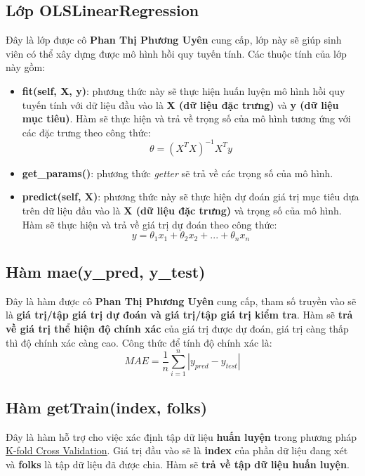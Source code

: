 \documentclass{report}
\begin{document}
\subsection{Lớp OLSLinearRegression}\label{sec:olslinearregression}
    Đây là lớp được cô \textbf{Phan Thị Phương Uyên} cung cấp, lớp này sẽ giúp sinh viên có thể xây dựng được mô hình hồi quy tuyến tính. Các thuộc tính của lớp này gồm:
    \begin{itemize}
        \item \textbf{fit(self, X, y)}: phương thức này sẽ thực hiện huấn luyện mô hình hồi quy tuyến tính với dữ liệu đầu vào là \textbf{X (dữ liệu đặc trưng)} và \textbf{y (dữ liệu mục tiêu)}. Hàm sẽ thực hiện và trả về trọng số của mô hình tương ứng với các đặc trưng theo công thức:
        \begin{equation}
            \theta = (X^TX)^{-1}X^Ty
        \end{equation}

        \item \textbf{get\_params()}: phương thức \textit{getter} sẽ trả về các trọng số của mô hình.
        
        \item \textbf{predict(self, X)}: phương thức này sẽ thực hiện dự đoán giá trị mục tiêu dựa trên dữ liệu đầu vào là \textbf{X (dữ liệu đặc trưng)} và trọng số của mô hình. Hàm sẽ thực hiện và trả về giá trị dự đoán theo công thức:
        \begin{equation}
            y = \theta_1x_1 + \theta_2x_2 + ... + \theta_nx_n
        \end{equation}
    \end{itemize}

\subsection{Hàm mae(y\_pred, y\_test)}\label{sec:mae}
    Đây là hàm được cô \textbf{Phan Thị Phương Uyên} cung cấp, tham số truyền vào sẽ là \textbf{giá trị/tập giá trị dự đoán và giá trị/tập giá trị kiểm tra}. Hàm sẽ \textbf{trả về giá trị thể hiện độ chính xác} của giá trị được dự đoán, giá trị càng thấp thì độ chính xác càng cao. Công thức để tính độ chính xác là:
    \begin{equation}
        MAE = \frac{1}{n}\sum_{i=1}^{n}|y_{pred} - y_{test}|
    \end{equation}

\subsection{Hàm getTrain(index, folks)}\label{sec:getTrain}
    Đây là hàm hỗ trợ cho việc xác định tập dữ liệu \textbf{huấn luyện} trong phương pháp \hyperref[sec:k-fold-cross-validation]{\underline{K-fold Cross Validation}}. Giá trị đầu vào sẽ là \textbf{index} của phần dữ liệu đang xét và \textbf{folks} là tập dữ liệu đã được chia. Hàm sẽ \textbf{trả về tập dữ liệu huấn luyện}.
\end{document}
